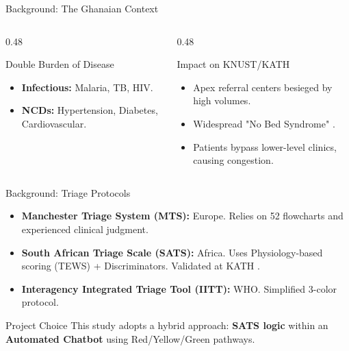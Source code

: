 \documentclass[aspectratio=169,12pt]{beamer}
\begin{document}
	\begin{frame}{Background: The Ghanaian Context}
		\begin{columns}[T]
			\begin{column}{0.48\textwidth}
				\begin{alertblock}{Double Burden of Disease}
					\begin{itemize}
						\item \textbf{Infectious:} Malaria, TB, HIV.
						\item \textbf{NCDs:} Hypertension, Diabetes, Cardiovascular.
					\end{itemize}
				\end{alertblock}
			\end{column}
			
			\begin{column}{0.48\textwidth}
				\begin{block}{Impact on KNUST/KATH}
					\begin{itemize}
						\item Apex referral centers besieged by high volumes.
						\item Widespread "No Bed Syndrome" \citep{ReachAlliance2026}.
						\item Patients bypass lower-level clinics, causing congestion.
					\end{itemize}
				\end{block}
			\end{column}
		\end{columns}
	\end{frame}
	
	\begin{frame}{Background: Triage Protocols}
		\begin{itemize}
			\item \textbf{Manchester Triage System (MTS):} Europe. Relies on 52 flowcharts and experienced clinical judgment.
			\item \textbf{South African Triage Scale (SATS):} Africa. Uses Physiology-based scoring (TEWS) + Discriminators. Validated at KATH \citep{Rominski2014}.
			\item \textbf{Interagency Integrated Triage Tool (IITT):} WHO. Simplified 3-color protocol.
		\end{itemize}
		
		\begin{exampleblock}{Project Choice}
			This study adopts a hybrid approach: \textbf{SATS logic} within an \textbf{Automated Chatbot} using Red/Yellow/Green pathways.
		\end{exampleblock}
	\end{frame}
	
\end{document}
